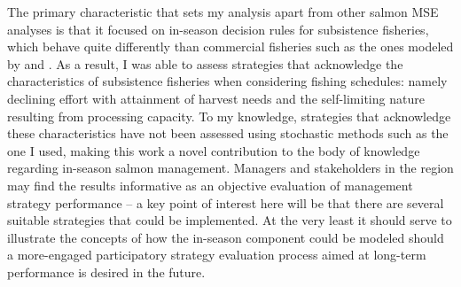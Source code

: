 \documentclass[12pt,]{book}
\theoremstyle{definition}
\theoremstyle{definition}
\theoremstyle{definition}
\theoremstyle{remark}
\begin{document}
The primary characteristic that sets my analysis apart from other salmon
MSE analyses is that it focused on in-season decision rules for
subsistence fisheries, which behave quite differently than commercial
fisheries such as the ones modeled by \citet{carney-adkison-2014a} and
\citet{carney-adkison-2014b}. As a result, I was able to assess
strategies that acknowledge the characteristics of subsistence fisheries
when considering fishing schedules: namely declining effort with
attainment of harvest needs and the self-limiting nature resulting from
processing capacity. To my knowledge, strategies that acknowledge these
characteristics have not been assessed using stochastic methods such as
the one I used, making this work a novel contribution to the body of
knowledge regarding in-season salmon management. Managers and
stakeholders in the region may find the results informative as an
objective evaluation of management strategy performance -- a key point
of interest here will be that there are several suitable strategies that
could be implemented. At the very least it should serve to illustrate
the concepts of how the in-season component could be modeled should a
more-engaged participatory strategy evaluation process aimed at
long-term performance is desired in the future.

\clearpage
\end{document}
